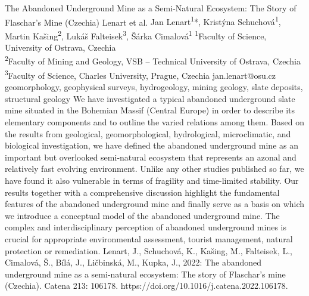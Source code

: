 \abstract
{The Abandoned Underground Mine as a Semi-Natural Ecosystem: The Story of Flaschar's Mine (Czechia)} 
{Lenart et al.} 
{Jan Lenart\textsuperscript{1}*, Kristýna Schuchová\textsuperscript{1}, Martin Kašing\textsuperscript{2}, Lukáš Falteisek\textsuperscript{3}, Šárka Cimalová\textsuperscript{1}} 
{\TLtag} 
{
\textsuperscript{1}Faculty of Science, University of Ostrava, Czechia\\
\textsuperscript{2}Faculty of Mining and Geology, VSB – Technical University of Ostrava, Czechia\\
\textsuperscript{3}Faculty of Science, Charles University, Prague, Czechia
}
{jan.lenart@osu.cz}  %
{geomorphology, geophysical surveys, hydrogeology, mining geology, slate deposits, structural geology}
{We have investigated a typical abandoned underground slate mine situated in the Bohemian Massif (Central Europe) in order to describe its elementary components and to outline the varied relations among them. Based on the results from geological, geomorphological, hydrological, microclimatic, and biological investigation, we have defined the abandoned underground mine as an important but overlooked semi-natural ecosystem that represents an azonal and relatively fast evolving environment. Unlike any other studies published so far, we have found it also vulnerable in terms of fragility and time-limited stability. Our results together with a comprehensive discussion highlight the fundamental features of the abandoned underground mine and finally serve as a basis on which we introduce a conceptual model of the abandoned underground mine. The complex and interdisciplinary perception of abandoned underground mines is crucial for appropriate environmental assessment, tourist management, natural protection or remediation.
}
{Lenart, J., Schuchová, K., Kašing, M., Falteisek, L., Cimalová, Š., Bílá, J., Ličbinská, M., Kupka, J., 2022: The abandoned underground mine as a semi-natural ecosystem: The story of Flaschar's mine (Czechia). Catena 213: 106178. https://doi.org/10.1016/j.catena.2022.106178.
}

